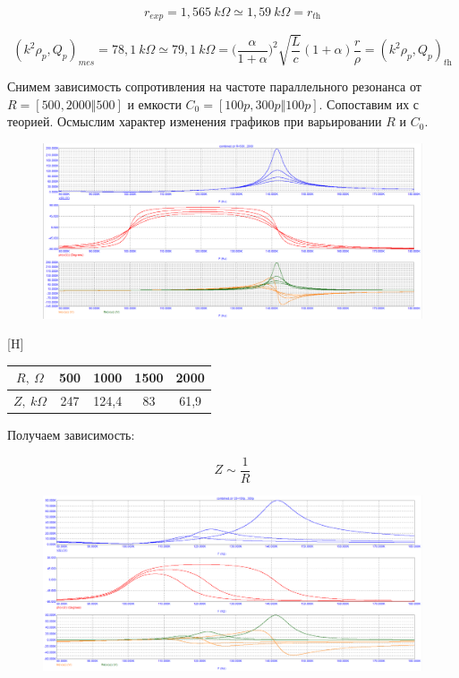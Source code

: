 \documentclass{article}
\begin{document}
\[r_{exp} = 1,565 \: k\Omega \simeq 1,59 \: k\Omega = r_{\textit{th}}\]

\[(k^2\rho_p, Q_p)_{mes} = 78,1 \: k\Omega \simeq  79,1 \: k\Omega = \Big(\frac{\alpha}{1 + \alpha}\Big)^2 \sqrt{\frac{L}{c}}(1 + \alpha)\frac{r}{\rho} = (k^2\rho_p, Q_p)_{\textit{th}}\]

Снимем зависимость сопротивления на частоте параллельного резонанса от $R = [500, 2000 \Vert 500]$ и емкости $C_0 = [100p, 300p \Vert 100p]$. Сопоставим их с теорией. Осмыслим характер изменения графиков при варьировании $R$ и $C_0$.

\begin{figure}[H]
\centering
\includegraphics[scale=0.4]{combined_AC2.png}
\label{fig:Image1}
\end{figure}

\begin{center}[H]
\begin{tabular}{|c|c|c|c|c|}
\hline 
$R, \: \Omega$ & 500 & 1000 & 1500 & 2000 \\ 
\hline 
$Z, \: k\Omega$ & 247 & 124,4 & 83 & 61,9 \\ 
\hline 
\end{tabular} 
\end{center}

Получаем зависимость:

\[Z \sim \frac{1}{R}\]

\begin{figure}[H]
\centering
\includegraphics[scale=0.4]{combined_AC3.png}
\label{fig:Image1}
\end{figure}
\end{document}
